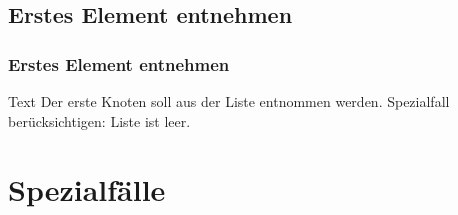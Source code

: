 \begin{multicols}{2}
\begin{frame}[fragile]
\end{frame}


\subsection{Erstes Element entnehmen}

\begin{frame}[fragile]
\frametitle<presentation>{Erstes Element entnehmen}

\begin{assignment}{3cm}{Text}
Der erste Knoten soll aus der Liste entnommen werden.
Spezialfall berücksichtigen: Liste ist leer.
\end{assignment}

\end{frame}


\end{multicols}


\section{Spezialfälle}

